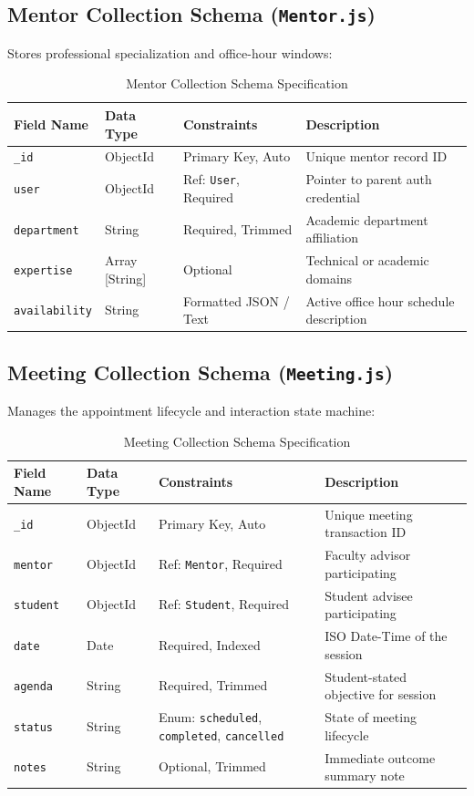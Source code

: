 \documentclass[11pt,a4paper]{article}
\begin{document}
\subsection{Mentor Collection Schema (\texttt{Mentor.js})}
Stores professional specialization and office-hour windows:
\begin{table}[H]
\centering
\small
\begin{tabularx}{\textwidth}{llp{3cm}X}
\toprule
\textbf{Field Name} & \textbf{Data Type} & \textbf{Constraints} & \textbf{Description} \\
\midrule
\texttt{\_id} & ObjectId & Primary Key, Auto & Unique mentor record ID \\
\texttt{user} & ObjectId & Ref: \texttt{User}, Required & Pointer to parent auth credential \\
\texttt{department} & String & Required, Trimmed & Academic department affiliation \\
\texttt{expertise} & Array [String] & Optional & Technical or academic domains \\
\texttt{availability} & String & Formatted JSON / Text & Active office hour schedule description \\
\bottomrule
\end{tabularx}
\caption{Mentor Collection Schema Specification}
\end{table}

\subsection{Meeting Collection Schema (\texttt{Meeting.js})}
Manages the appointment lifecycle and interaction state machine:
\begin{table}[H]
\centering
\small
\begin{tabularx}{\textwidth}{llp{3cm}X}
\toprule
\textbf{Field Name} & \textbf{Data Type} & \textbf{Constraints} & \textbf{Description} \\
\midrule
\texttt{\_id} & ObjectId & Primary Key, Auto & Unique meeting transaction ID \\
\texttt{mentor} & ObjectId & Ref: \texttt{Mentor}, Required & Faculty advisor participating \\
\texttt{student} & ObjectId & Ref: \texttt{Student}, Required & Student advisee participating \\
\texttt{date} & Date & Required, Indexed & ISO Date-Time of the session \\
\texttt{agenda} & String & Required, Trimmed & Student-stated objective for session \\
\texttt{status} & String & Enum: \texttt{scheduled}, \texttt{completed}, \texttt{cancelled} & State of meeting lifecycle \\
\texttt{notes} & String & Optional, Trimmed & Immediate outcome summary note \\
\bottomrule
\end{tabularx}
\caption{Meeting Collection Schema Specification}
\end{table}
\end{document}
